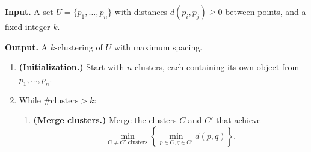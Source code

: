 \begin{mdframed}[
    linewidth=1pt,
    linecolor=black,
    bottomline=false,topline=false,rightline=false,
    innerrightmargin=0pt,innertopmargin=0pt,innerbottommargin=0pt,
    innerleftmargin=1em,%
    skipabove=0.75\baselineskip
]
{\bf Input.} A set $U = \{p_1, \dots, p_n\}$ with 
distances $d(p_i, p_j) \geq 0$ between points, and a fixed integer $k$.

{\bf Output.} A $k$-clustering of $U$ with maximum spacing.
\begin{enumerate}[leftmargin=1.75cm, label={Step \arabic*.}]
    \item {\bf (Initialization.)} Start with $n$ clusters, each containing 
    its own object from $p_1, \dots, p_n$. 

    \item While $\# \text{clusters} > k$:
    \begin{enumerate}[label={}]
        \item {\bf (Merge clusters.)} Merge the clusters $C$ and $C'$ 
        that achieve 
        \[ \min_{C\neq C' \text{ clusters}} \left\{ \min_{p\in C, q\in C'} 
        d(p, q) \right\}. \] 
    \end{enumerate}
\end{enumerate}
\end{mdframed}\vspace{-0.15cm}